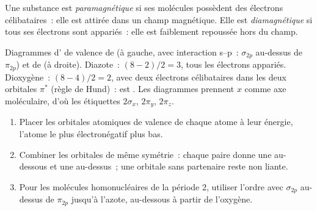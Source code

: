 \begin{definition}\label{def:b2:diatomic-mos:magnetism}
Une substance est \emph{paramagnétique} si ses molécules possèdent des
électrons célibataires~: elle est attirée dans un champ magnétique. Elle est
\emph{diamagnétique} si tous ses électrons sont appariés~: elle est
faiblement repoussée hors du champ.
\end{definition}

\begin{omfigure}
\begin{MOdiagram}[names, labels, style=square, distance=4.2cm, labels-fs=\scriptsize]
\end{MOdiagram}
\hfill
\begin{MOdiagram}[names, labels, style=square, distance=4.2cm, labels-fs=\scriptsize]
\end{MOdiagram}

{\small Diagrammes d' de valence de  (à gauche, avec interaction s--p~:
$\sigma_{2p}$ au-dessus de $\pi_{2p}$) et de  (à droite). Diazote~: 
$(8 - 2)/2 = 3$, tous les électrons appariés. Dioxygène~:  $(8 - 4)/2 = 2$, avec deux
électrons célibataires dans les deux orbitales $\pi^*$ (règle de Hund)~:  est
. Les diagrammes prennent $x$ comme axe moléculaire, d'où les étiquettes
$2\sigma_x$, $2\pi_y$, $2\pi_z$.}
\end{omfigure}

\begin{method}\label{met:b2:diatomic-mos:build-diagram}
\begin{enumerate}
  \item Placer les orbitales atomiques de valence de chaque atome à leur énergie, l'atome le plus
        électronégatif plus bas.
  \item Combiner les orbitales de même symétrie~: chaque paire donne une 
        au-dessous et une  au-dessus~; une orbitale sans partenaire reste
        non liante.
  \item Pour les molécules homonucléaires de la période 2, utiliser l'ordre avec $\sigma_{2p}$ au-dessus
        de $\pi_{2p}$ jusqu'à l'azote, au-dessous à partir de l'oxygène.
\end{enumerate}
\end{method}

